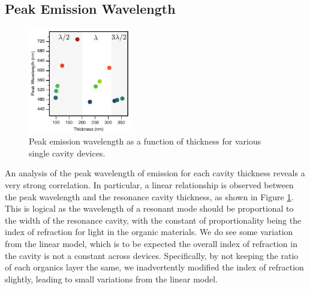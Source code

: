 \documentclass{report}
\begin{document}

    
        \subsection{Peak Emission Wavelength} \label{peakWavelength}
            \begin{figure}
                \centering
                \vspace{-0.5cm}
                \includegraphics[width=0.4\textwidth]{images/n1_peak_emission.png}
                \caption{\small Peak emission wavelength as a function of thickness for various single cavity devices.}
                \label{fig:peak_emission}
            \end{figure}

            An analysis of the peak wavelength of emission for each cavity thickness reveals a very strong correlation. In particular, a linear relationship is observed between the peak wavelength and the resonance cavity thickness, as shown in Figure \ref{fig:peak_emission}. This is logical as the wavelength of a resonant mode should be proportional to the width of the resonance cavity, with the constant of proportionality being the index of refraction for light in the organic materials. We do see some variation from the linear model, which is to be expected the overall index of refraction in the cavity is not a constant across devices. Specifically, by not keeping the ratio of each organics layer the same, we inadvertently modified the index of refraction slightly, leading to small variations from the linear model.
            
\end{document}
